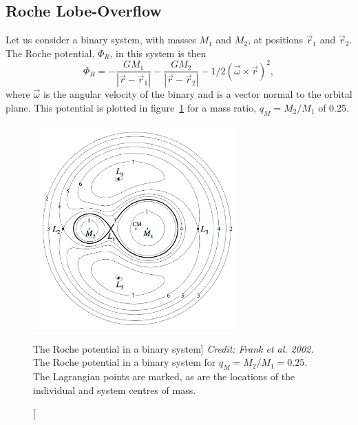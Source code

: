 \subsection{Roche Lobe-Overflow}

Let us consider a binary system, with masses $M_1$ and $M_2$, at positions
$\vec{r}_1$ and $\vec{r}_2$. The Roche potential, $\Phi_R$, in this system 
is then
\begin{equation}
\Phi_R = - \frac{GM_1}{| \vec{r} - \vec{r}_1 |} - 
\frac{GM_2}{| \vec{r} - \vec{r}_2 |} - 1/2 (\vec{\omega} \times
 \vec{r})^2,
\label{eq:roche}
\end{equation} 
where $\vec{\omega}$ is the angular velocity of the binary and is a vector normal to
the orbital plane. This potential is plotted in figure~\ref{fig:roche} for a mass ratio, 
$q_M = M_2 / M_1$ of 0.25.

\begin{figure}
\centering
\includegraphics[width=0.7\textwidth]{figures/01-intro/roche_potential.png}
\caption
[The Roche potential in a binary system]
{
{\sl Credit: Frank et al. 2002.} 
The Roche potential in a binary system for $q_M = M_2 / M_1 = 0.25$.
The Lagrangian points are marked, as are the locations of the individual
and system centres of mass.
} 
\label{fig:roche}
\end{figure}

